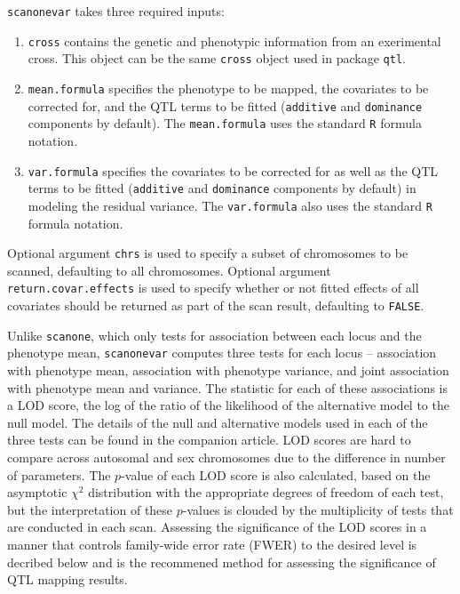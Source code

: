 \documentclass[9pt,twocolumn,twoside]{gsag3jnl}
\begin{document}
\texttt{scanonevar} takes three required inputs:

\begin{enumerate}
    \item \texttt{cross} contains the genetic and phenotypic information from an exerimental cross.  This object can be the same \texttt{cross} object used in package \texttt{qtl}.
    \item \texttt{mean.formula} specifies the phenotype to be mapped, the covariates to be corrected for, and the QTL terms to be fitted (\texttt{additive} and \texttt{dominance} components by default).  The \texttt{mean.formula} uses the standard \texttt{R} formula notation.
    \item \texttt{var.formula} specifies the covariates to be corrected for as well as the QTL terms to be fitted (\texttt{additive} and \texttt{dominance} components by default) in modeling the residual variance.  The \texttt{var.formula} also uses the standard \texttt{R} formula notation.
\end{enumerate}

Optional argument \texttt{chrs} is used to specify a subset of chromosomes to be scanned, defaulting to all chromosomes.
Optional argument \texttt{return.covar.effects} is used to specify whether or not fitted effects of all covariates should be returned as part of the scan result, defaulting to \texttt{FALSE}.

Unlike \texttt{scanone}, which only tests for association between each locus and the phenotype mean, \texttt{scanonevar} computes three tests for each locus -- association with phenotype mean, association with phenotype variance, and joint association with phenotype mean and variance.
The statistic for each of these associations is a LOD score, the log of the ratio of the likelihood of the alternative model to the null model.
The details of the null and alternative models used in each of the three tests can be found in the companion article.
LOD scores are hard to compare across autosomal and sex chromosomes due to the difference in number of parameters.
The $p$-value of each LOD score is also calculated, based on the asymptotic $\chi^2$ distribution with the appropriate degrees of freedom of each test, but the interpretation of these $p$-values is clouded by the multiplicity of tests that are conducted in each scan.
Assessing the significance of the LOD scores in a manner that controls family-wide error rate (FWER) to the desired level is decribed below and is the recommened method for assessing the significance of QTL mapping results.
\end{document}
